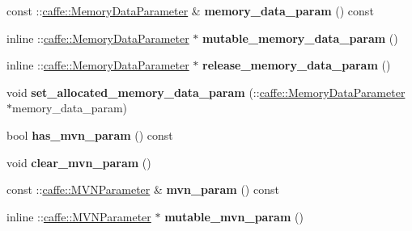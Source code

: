 \begin{DoxyCompactItemize}
const \+::\mbox{\hyperlink{classcaffe_1_1_memory_data_parameter}{caffe\+::\+Memory\+Data\+Parameter}} \& {\bfseries memory\+\_\+data\+\_\+param} () const
\item 
\mbox{\label{classcaffe_1_1_layer_parameter_ad4c34b5d38b500a75a6c54bab05d6d2f}} 
inline \+::\mbox{\hyperlink{classcaffe_1_1_memory_data_parameter}{caffe\+::\+Memory\+Data\+Parameter}} $\ast$ {\bfseries mutable\+\_\+memory\+\_\+data\+\_\+param} ()
\item 
\mbox{\label{classcaffe_1_1_layer_parameter_a224a7f68f642e8eba7861518fed3b68f}} 
inline \+::\mbox{\hyperlink{classcaffe_1_1_memory_data_parameter}{caffe\+::\+Memory\+Data\+Parameter}} $\ast$ {\bfseries release\+\_\+memory\+\_\+data\+\_\+param} ()
\item 
\mbox{\label{classcaffe_1_1_layer_parameter_ab55415cfbfc19f58c71b97d9badc793f}} 
void {\bfseries set\+\_\+allocated\+\_\+memory\+\_\+data\+\_\+param} (\+::\mbox{\hyperlink{classcaffe_1_1_memory_data_parameter}{caffe\+::\+Memory\+Data\+Parameter}} $\ast$memory\+\_\+data\+\_\+param)
\item 
\mbox{\label{classcaffe_1_1_layer_parameter_aa8f6756013cf866d91753fca7a337b84}} 
bool {\bfseries has\+\_\+mvn\+\_\+param} () const
\item 
\mbox{\label{classcaffe_1_1_layer_parameter_a9d943f2619a3434dccb655c1a61146d0}} 
void {\bfseries clear\+\_\+mvn\+\_\+param} ()
\item 
\mbox{\label{classcaffe_1_1_layer_parameter_ac8d5e3ef9c86c014dfc9961ddc708924}} 
const \+::\mbox{\hyperlink{classcaffe_1_1_m_v_n_parameter}{caffe\+::\+M\+V\+N\+Parameter}} \& {\bfseries mvn\+\_\+param} () const
\item 
\mbox{\label{classcaffe_1_1_layer_parameter_aa15b5ddd1129e56c4c5bde07cbeb9559}} 
inline \+::\mbox{\hyperlink{classcaffe_1_1_m_v_n_parameter}{caffe\+::\+M\+V\+N\+Parameter}} $\ast$ {\bfseries mutable\+\_\+mvn\+\_\+param} ()
\item 
\mbox{\label{classcaffe_1_1_layer_parameter_a03ccf3c79a1a88c9729e57c26d4b154f}} 

\end{DoxyCompactItemize}
